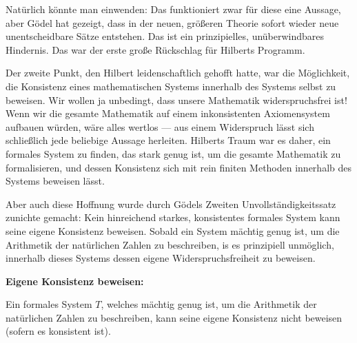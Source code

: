 \begin{spoken-clean}[01:01:38 - 01:03:50]
Natürlich könnte man einwenden:  Das funktioniert zwar für diese eine Aussage, aber Gödel hat gezeigt, dass in der neuen, größeren Theorie sofort wieder neue unentscheidbare Sätze entstehen. Das ist ein prinzipielles, unüberwindbares Hindernis. Das war der erste große Rückschlag für Hilberts Programm.

Der zweite Punkt, den Hilbert leidenschaftlich gehofft hatte, war die Möglichkeit, die Konsistenz eines mathematischen Systems innerhalb des Systems selbst zu beweisen. Wir wollen ja unbedingt, dass unsere Mathematik widerspruchsfrei ist! Wenn wir die gesamte Mathematik auf einem inkonsistenten Axiomensystem aufbauen würden, wäre alles wertlos --- aus einem Widerspruch lässt sich schließlich jede beliebige Aussage herleiten. Hilberts Traum war es daher, ein formales System zu finden, das stark genug ist, um die gesamte Mathematik zu formalisieren, und dessen Konsistenz sich mit rein finiten Methoden innerhalb des Systems beweisen lässt.

Aber auch diese Hoffnung wurde durch Gödels Zweiten Unvollständigkeitssatz zunichte gemacht: Kein hinreichend starkes, konsistentes formales System kann seine eigene Konsistenz beweisen. Sobald ein System mächtig genug ist, um die Arithmetik der natürlichen Zahlen zu beschreiben, is es prinzipiell unmöglich, innerhalb dieses Systems dessen eigene Widerspruchsfreiheit zu beweisen.
\end{spoken-clean}

\begin{math-stroke}
\textbf{Eigene Konsistenz beweisen:}

Ein formales System $T$, welches mächtig genug ist, um die Arithmetik der natürlichen Zahlen zu beschreiben, kann seine eigene Konsistenz nicht beweisen (sofern es konsistent ist).
\end{math-stroke}

\begin{ai-global-state-checkpoint-invisible-content}
\end{ai-global-state-checkpoint-invisible-content}

